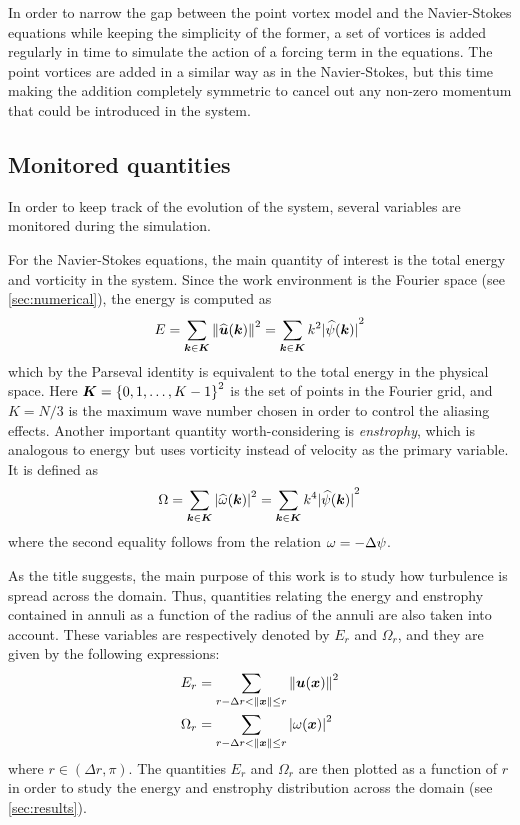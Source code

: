 \documentclass[../main.tex]{subfiles}
\begin{document}
In order to narrow the gap between the point vortex model and the Navier-Stokes equations while keeping the simplicity of the former, a set of vortices is added regularly in time to simulate the action of a forcing term in the equations. The point vortices are added in a similar way as in the Navier-Stokes, but this time making the addition completely symmetric to cancel out any non-zero momentum that could be introduced in the system.

\subsection{Monitored quantities}
In order to keep track of the evolution of the system, several variables are monitored during the simulation.

For the Navier-Stokes equations, the main quantity of interest is the total energy and vorticity in the system. Since the work environment is the Fourier space (see \cref{sec:numerical}), the energy is computed as
\begin{equation}
	E = \sum_{\boldsymbol{k}\in\boldsymbol{K}} \left\|\widehat{\boldsymbol{u}}(\boldsymbol{k})\right\|^2 = \sum_{\boldsymbol{k}\in\boldsymbol{K}} k^2 {|\widehat{\psi}(\boldsymbol{k})|}^2
\end{equation}
which by the Parseval identity is equivalent to the total energy in the physical space. Here $\boldsymbol{K} = {\{0,1,\ldots,K-1\}}^2$ is the set of points in the Fourier grid, and $K=N/3$ is the maximum wave number chosen in order to control the aliasing effects. Another important quantity worth-considering is \emph{enstrophy}, which is analogous to energy but uses vorticity instead of velocity as the primary variable. It is defined as
\begin{equation}
	\Omega = \sum_{\boldsymbol{k}\in\boldsymbol{K}} {|\widehat{\omega}(\boldsymbol{k})|}^2 = \sum_{\boldsymbol{k}\in\boldsymbol{K}} k^4 {|\widehat{\psi}(\boldsymbol{k})|}^2
\end{equation}
where the second equality follows from the relation $\omega = -\Delta \psi$.

As the title suggests, the main purpose of this work is to study how turbulence is spread across the domain. Thus, quantities relating the energy and enstrophy contained in annuli as a function of the radius of the annuli are also taken into account. These variables are respectively denoted by $E_r$ and $\Omega_r$, and they are given by the following expressions:
\begin{align}
	E_r      & = \sum_{r-\Delta r<\left\|\boldsymbol{x}\right\|\leq r} \left\|{\boldsymbol{u}}(\boldsymbol{x})\right\|^2  \\
	\Omega_r & = \sum_{r-\Delta r<\left\|\boldsymbol{x}\right\|\leq r} \abs{{{\omega}}(\boldsymbol{x})}^2
\end{align}
where $r\in (\Delta r, \pi)$. The quantities $E_r$ and $\Omega_r$ are then plotted as a function of $r$ in order to study the energy and enstrophy distribution across the domain (see \cref{sec:results}).
\end{document}
